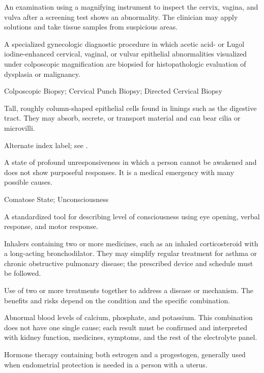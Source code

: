  An examination using a magnifying instrument to inspect the cervix, vagina, and vulva after a screening test shows an abnormality. The clinician may apply solutions and take tissue samples from suspicious areas.

 A specialized gynecologic diagnostic procedure in which acetic acid- or Lugol iodine-enhanced cervical, vaginal, or vulvar epithelial abnormalities visualized under colposcopic magnification are biopsied for histopathologic evaluation of dysplasia or malignancy.

\synonyms
Colposcopic Biopsy; Cervical Punch Biopsy; Directed Cervical Biopsy

 Tall, roughly column-shaped epithelial cells found in linings such as the digestive tract. They may absorb, secrete, or transport material and can bear cilia or microvilli.

 Alternate index label; see .

 A state of profound unresponsiveness in which a person cannot be awakened and does not show purposeful
responses. It is a medical emergency with many possible causes.

\synonyms
Comatose State; Unconsciousness

 A standardized tool for describing level of consciousness using eye opening, verbal response, and motor
response.

 Inhalers containing two or more medicines, such as an inhaled corticosteroid with a long-acting bronchodilator. They may simplify regular treatment for asthma or chronic obstructive pulmonary disease; the prescribed device and schedule must be followed.

 Use of two or more treatments together to address a disease or mechanism. The benefits and risks depend on the condition and
the specific combination.

 Abnormal blood levels of calcium, phosphate, and potassium. This combination does not have one single cause; each result must be confirmed and interpreted with kidney function, medicines, symptoms, and the rest of the electrolyte panel.

 Hormone therapy containing both estrogen and a progestogen, generally used when endometrial protection is needed in a person with a uterus.


